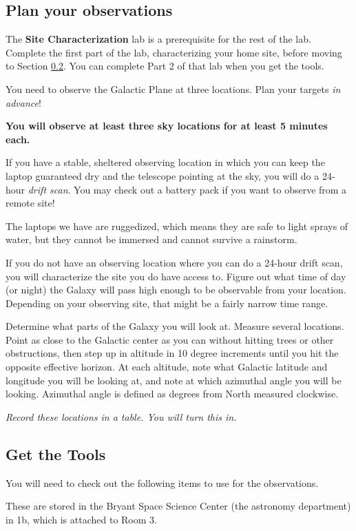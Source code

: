 \documentclass[11pt]{article}
\begin{document}
\subsection{Plan your observations}
The \textbf{Site Characterization} lab is a prerequisite for the rest of the lab.
Complete the first part of the lab, characterizing your home site,
before moving to Section \ref{sec:gettingthetools}.
You can complete Part 2 of that lab when you get the tools.

You need to observe the Galactic Plane at three locations.
Plan your targets \emph{in advance}!

\textbf{You will observe at least three sky locations for at least 5 minutes each.}

If you have a stable, sheltered observing location in which you can keep
the laptop guaranteed dry and the telescope pointing
at the sky, you will do a 24-hour \emph{drift scan}.
You may check out a battery pack if you want to observe from a remote site!

The laptops we have are ruggedized, which means they are safe to light sprays of
water, but they cannot be immersed and cannot survive a rainstorm.

If you do not have an observing location where you can do a 24-hour drift scan,
you will characterize the site you do have access to.  Figure out what
time of day (or night) the Galaxy will pass high enough to be observable
from your location.  Depending on your observing site, that might be
a fairly narrow time range.

Determine what parts of the Galaxy you will look at.
Measure several locations.
Point as close to the Galactic center as you can without hitting trees
or other obstructions, then step up in altitude in 10 degree increments until you hit the opposite
effective horizon.  At each altitude, note what Galactic latitude and
longitude you will be looking at, and note at which azimuthal angle you will be
looking.  Azimuthal angle is defined as degrees from North measured clockwise.

\textit{Record these locations in a table.  You will turn this in.}


\clearpage
\subsection{Get the Tools}
\label{sec:gettingthetools}
You will need to check out the following items to use for the observations.

These are stored in the Bryant Space Science Center (the astronomy department) in 1b, which
is attached to Room 3.
\end{document}
